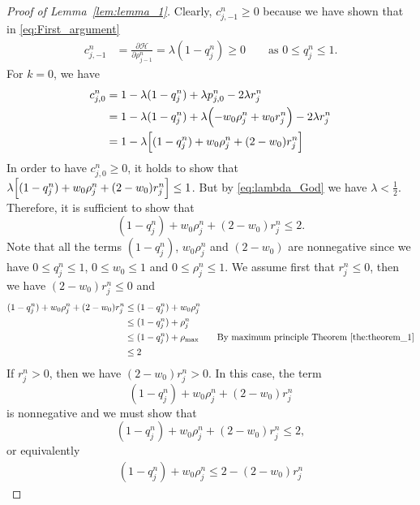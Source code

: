 \begin{proof}[Proof of Lemma~\ref{lem:lemma_1}]
    Clearly, $c_{j,-1}^n \geq 0$ because we have shown that in \eqref{eq:First_argument}
    \begin{align*}
        c_{j,-1}^n & =\frac{\partial \mathcal{H}}{\partial \rho_{j-1}^n} = \lambda(1-q_j^n) \geq 0 \qquad \text{as } 0 \leq q_j^n \leq 1.
    \end{align*}
    For $k= 0$, we have
    \begin{align*}
        c_{j,0}^n & = 1 - \lambda (1- q_j^n) + \lambda p_{j,0}^n -2\lambda r_j^n                            \\
                  & = 1 - \lambda (1- q_j^n) + \lambda \Bigl(-w_0\rho_j^n + w_0 r_j^n\Bigr) -2\lambda r_j^n \\
                  & = 1- \lambda \Bigl[(1- q_j^n)+ w_0\rho_j^n  + (2-w_0)r_j^n\Bigr]
    \end{align*}
    In order to have  $c_{j,0}^n \geq 0$, it holds to show that $\lambda \Bigl[(1- q_j^n)+ w_0\rho_j^n  + (2-w_0)r_j^n\Bigr] \leq 1$. But by \eqref{eq:lambda_God} we have $\lambda < \frac{1}{2}$. Therefore, it is sufficient to show that
    \[
        (1- q_j^n)+ w_0\rho_j^n  + (2-w_0)r_j^n \leq 2.
    \]
    Note that all the terms $(1- q_j^n)$, $w_0\rho_j^n$ and $(2-w_0)$ are nonnegative since we have $ 0\leq q_j^n \leq 1$,  $0 \leq  w_0 \leq 1$ and  $0\leq \rho_j^n \leq 1$. We assume first that $r_j^n \leq 0$, then we have $(2-w_0)r_j^n \leq 0$ and
    \begin{align*}
        (1- q_j^n)+ w_0\rho_j^n  + (2-w_0)r_j^n & \leq (1- q_j^n)+ w_0\rho_j^n                                                                \\
                                                & \leq (1- q_j^n)+ \rho_j^n                                                                   \\
                                                & \leq (1-q_j^n) + \rho_{\max} \qquad \text{By maximum principle Theorem~\ref{the:theorem_1}} \\
                                                & \leq 2
    \end{align*}
    If $r_j^n >0$, then we have $(2-w_0)r_j^n >0$. In this case, the term
    \[
        (1- q_j^n)+ w_0\rho_j^n  + (2-w_0)r_j^n
    \]
    is nonnegative and we must show that
    \[
        (1- q_j^n)+ w_0\rho_j^n  + (2-w_0)r_j^n \leq 2,
    \]
    or equivalently
    \begin{equation}\label{eq:C0}
        \begin{split}
            (1- q_j^n)+ w_0\rho_j^n \leq 2 - (2-w_0)r_j^n

\end{split}
\end{equation}
\end{proof}
